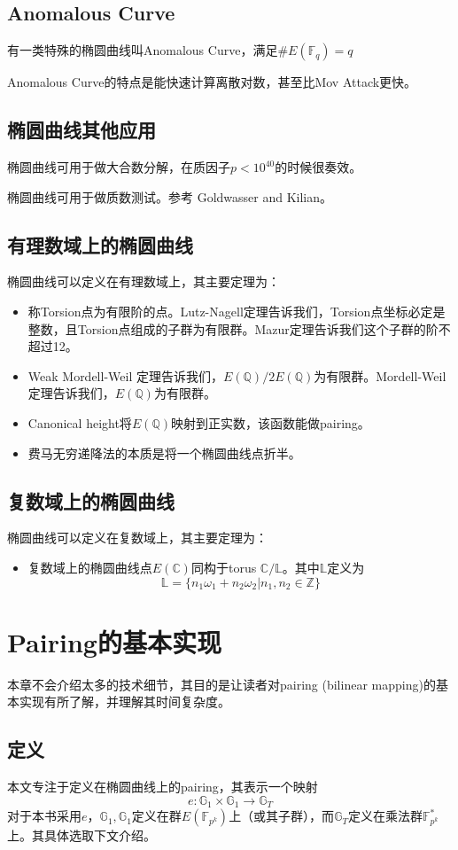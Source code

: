 \documentclass[12pt]{article}
\newcommand{\ec}{椭圆曲线}
\newcommand{\fpk}{\mathbb{F}_{p^k}}
\newcommand{\fq}{\mathbb{F}_q}
\begin{document}
\subsection{Anomalous Curve}
有一类特殊的\ec 叫Anomalous Curve，满足$\# E(\fq) = q$

Anomalous Curve的特点是能快速计算离散对数，甚至比Mov Attack更快。
\subsection{\ec 其他应用}
\ec 可用于做大合数分解，在质因子$p<10^{40}$的时候很奏效。

\ec 可用于做质数测试。参考 Goldwasser and Kilian。
\subsection{有理数域上的\ec}
\ec 可以定义在有理数域上，其主要定理为：
\begin{itemize}
	\item 称Torsion点为有限阶的点。Lutz-Nagell定理告诉我们，Torsion点坐标必定是整数，且Torsion点组成的子群为有限群。Mazur定理告诉我们这个子群的阶不超过12。
	\item Weak Mordell-Weil 定理告诉我们，$E(\mathbb{Q})/2E(\mathbb{Q}) $为有限群。Mordell-Weil 定理告诉我们，$E(\mathbb{Q})$为有限群。
	\item Canonical height将$E(\mathbb{Q})$映射到正实数，该函数能做pairing。
	\item 费马无穷递降法的本质是将一个\ec 点折半。
\end{itemize}
\subsection{复数域上的\ec}
\ec 可以定义在复数域上，其主要定理为：
\begin{itemize}
	\item 复数域上的\ec 点$E(\mathbb{C})$同构于torus $\mathbb{C}/\mathbb{L}$。其中$\mathbb{L}$定义为
	$$\mathbb{L}= \{n_1\omega_1+n_2\omega_2|n_1,n_2 \in \mathbb{Z}\}$$
\end{itemize}

\section{Pairing的基本实现}
本章不会介绍太多的技术细节，其目的是让读者对pairing (bilinear mapping)的基本实现有所了解，并理解其时间复杂度。

\subsection{定义}
本文专注于定义在\ec 上的pairing，其表示一个映射
$$e: \mathbb{G}_1 \times \mathbb{G}_1 \rightarrow \mathbb{G}_T$$
对于本书采用$e$，$\mathbb{G}_1, \mathbb{G}_1$定义在群$E(\fpk)$上（或其子群），而$ \mathbb{G}_T$定义在乘法群$\fpk^*$上。其具体选取下文介绍。
\end{document}
